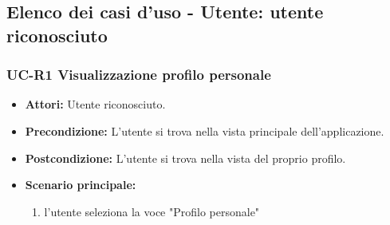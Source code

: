 \subsection{Elenco dei casi d'uso - Utente: utente riconosciuto}
\subsubsection{UC-R1 Visualizzazione profilo personale}
\begin{itemize}
	\item \textbf{Attori:} Utente riconosciuto.
	\item \textbf{Precondizione:} L'utente si trova nella vista principale dell'applicazione.
	\item \textbf{Postcondizione:} L'utente si trova nella vista del proprio profilo.
	\item \textbf{Scenario principale:}
		\begin{enumerate}
			\item l'utente seleziona la voce "Profilo personale"
		\end{enumerate}
\end{itemize}

